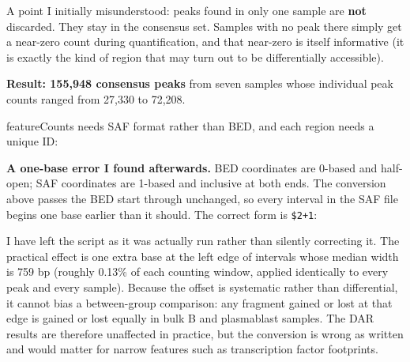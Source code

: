 \documentclass[
  11pt,
  a4paper,
]{article}
\newenvironment{Shaded}{}{}
\newcommand{\AlertTok}[1]{\textcolor[rgb]{1.00,0.00,0.00}{\textbf{#1}}}
\newcommand{\CommentTok}[1]{\textcolor[rgb]{0.38,0.63,0.69}{\textit{#1}}}
\newcommand{\ExtensionTok}[1]{#1}
\newcommand{\FunctionTok}[1]{\textcolor[rgb]{0.02,0.16,0.49}{#1}}
\newcommand{\NormalTok}[1]{#1}
\newcommand{\OperatorTok}[1]{\textcolor[rgb]{0.40,0.40,0.40}{#1}}
\newcommand{\StringTok}[1]{\textcolor[rgb]{0.25,0.44,0.63}{#1}}
\newcommand{\VariableTok}[1]{\textcolor[rgb]{0.10,0.09,0.49}{#1}}
\begin{document}
A point I initially misunderstood: peaks found in only one sample are
\textbf{not} discarded. They stay in the consensus set. Samples with no
peak there simply get a near-zero count during quantification, and that
near-zero is itself informative (it is exactly the kind of region that
may turn out to be differentially accessible).

\textbf{Result: 155,948 consensus peaks} from seven samples whose
individual peak counts ranged from 27,330 to 72,208.

featureCounts needs SAF format rather than BED, and each region needs a
unique ID:

\begin{Shaded}
\end{Shaded}

\textbf{A one-base error I found afterwards.} BED coordinates are
0-based and half-open; SAF coordinates are 1-based and inclusive at both
ends. The conversion above passes the BED start through unchanged, so
every interval in the SAF file begins one base earlier than it should.
The correct form is \texttt{\$2+1}:

\begin{Shaded}
\end{Shaded}

I have left the script as it was actually run rather than silently
correcting it. The practical effect is one extra base at the left edge
of intervals whose median width is 759 bp (roughly 0.13\% of each
counting window, applied identically to every peak and every sample).
Because the offset is systematic rather than differential, it cannot
bias a between-group comparison: any fragment gained or lost at that
edge is gained or lost equally in bulk B and plasmablast samples. The
DAR results are therefore unaffected in practice, but the conversion is
wrong as written and would matter for narrow features such as
transcription factor footprints.
\end{document}
